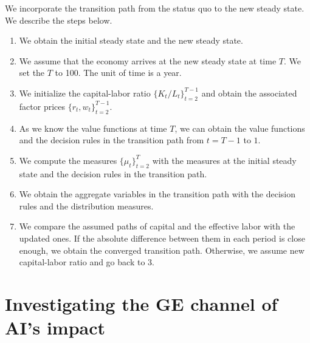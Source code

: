 \documentclass[12pt]{article}
\begin{document}
We incorporate the transition path from the status quo to the new
steady state. We describe the steps below.
\begin{enumerate}
\item We obtain the initial steady state and the new steady state.
\item We assume that the economy arrives at the new steady state at time
$T$. We set the $T$ to 100. The unit of time is a year.
\item We initialize the capital-labor ratio $\{K_{t}/L_{t}\}_{t=2}^{T-1}$
and obtain the associated factor prices $\{r_{t},w_{t}\}_{t=2}^{T-1}$. 
\item As we know the value functions at time $T$, we can obtain the value
functions and the decision rules in the transition path from $t=T-1$
to $1$. 
\item We compute the measures $\{\mu_{t}\}_{t=2}^{T}$ with the measures
at the initial steady state and the decision rules in the transition
path. 
\item We obtain the aggregate variables in the transition path with the
decision rules and the distribution measures. 
\item We compare the assumed paths of capital and the effective labor with
the updated ones. If the absolute difference between them in each
period is close enough, we obtain the converged transition path. Otherwise,
we assume new capital-labor ratio and go back to 3.
\end{enumerate}

\section{Investigating the GE channel of AI's impact}
\end{document}
